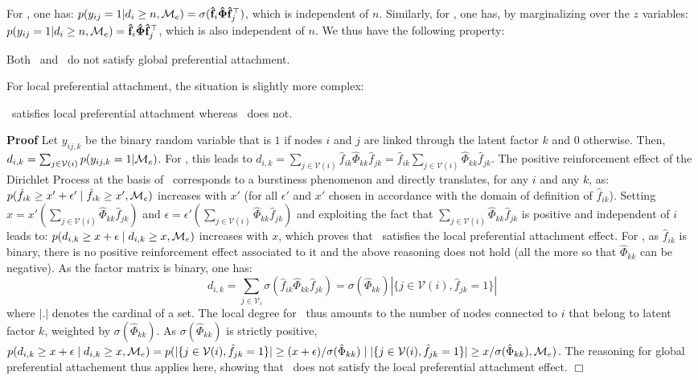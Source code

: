 For \ifm, one has: $p(y_{ij}=1 | d_i \ge n, \mathcal{M}_e) = \sigma(\mathbf{\hat{f}}_i \mathbf{\hat{\Phi}} \mathbf{\hat{f}}_j^\top)$, which is independent of $n$. Similarly, for \imb, one has, by marginalizing over the $z$ variables: $p(y_{ij}=1 | d_i \ge n, \mathcal{M}_e) = \mathbf{\hat{f}}_i \mathbf{\hat{\Phi}} \mathbf{\hat{f}}_j^\top$, which is also independent of $n$. We thus have the following property:
%
\begin{proposition}[]
\label{pref-attch-glob}
Both \ifm\ and \imb\ do not satisfy global preferential attachment.
\end{proposition}

For local preferential attachment, the situation is slightly more complex:
%
\begin{proposition}[]
\label{pref-attch-loc}
\imb\ satisfies local preferential attachment whereas \ifm\ does not.
\end{proposition}
%
\noindent \textbf{Proof} Let $y_{ij,k}$ be the binary random variable that is $1$ if nodes $i$ and $j$ are linked through the latent factor $k$ and $0$ otherwise. Then, $d_{i,k} = \sum_{j \in \mathcal{V}(i)} p(y_{ij,k} =1 | \mathcal{M}_e)$. For \imb, this leads to $d_{i,k} = \sum_{j \in \mathcal{V}(i)} \hat{f}_{ik} \hat{\Phi}_{kk} \hat{f}_{jk} = \hat{f}_{ik} \sum_{j \in \mathcal{V}(i)} \hat{\Phi}_{kk} \hat{f}_{jk}$. The positive reinforcement effect of the Dirichlet Process \cite{teh2006hierarchical} at the basis of \imb\ corresponds to a burstiness phenomenon and directly translates, for any $i$ and any $k$, as: $p(\hat{f}_{ik} \ge x'+\epsilon' \mid \hat{f}_{ik} \ge x',\mathcal{M}_e)$ increases with $x'$ (for all $\epsilon'$ and $x'$ chosen in accordance with the domain of definition of $\hat{f}_{ik}$). Setting $x=x'(\sum_{j \in \mathcal{V}(i)} \hat{\Phi}_{kk} \hat{f}_{jk})$ and $\epsilon = \epsilon'(\sum_{j \in \mathcal{V}(i)} \hat{\Phi}_{kk} \hat{f}_{jk})$ and exploiting the fact that $\sum_{j \in \mathcal{V}(i)} \hat{\Phi}_{kk} \hat{f}_{jk}$ is positive and independent of $i$ leads to: $p(d_{i,k} \ge x+\epsilon \mid d_{i,k} \ge x, \mathcal{M}_e)$ increases with $x$, which proves that \imb\ satisfies the local preferential attachment effect. For \ifm, as $\hat{f}_{ik}$ is binary, there is no positive reinforcement effect associated to it and the above reasoning does not hold (all the more so that $\hat{\Phi}_{kk}$ can be negative). As the factor matrix is binary, one has:
%
\[ 
d_{i,k} = \sum_{j \in \mathcal{V}_i} \sigma(\hat{f}_{ik} \hat{\Phi}_{kk} \hat{f}_{jk}) =  \sigma(\hat{\Phi}_{kk}) |\{j \in \mathcal{V}(i), \hat{f}_{jk} =1\}|
\]
%
where $|.|$ denotes the cardinal of a set. The local degree for \ifm\ thus amounts to the number of nodes connected to $i$ that belong to latent factor $k$, weighted by $\sigma(\hat{\Phi}_{kk})$. As $\sigma(\hat{\Phi}_{kk})$ is strictly positive,  $p(d_{i,k} \ge x+\epsilon \mid d_{i,k} \ge x, \mathcal{M}_e) = p(|\{j \in \mathcal{V}(i), \hat{f}_{jk} =1\}| \ge (x+\epsilon)/ \sigma(\hat{\Phi}_{kk}) \mid |\{j \in \mathcal{V}(i), \hat{f}_{jk} =1\}| \ge x/\sigma(\hat{\Phi}_{kk}), \mathcal{M}_e)$. The reasoning for global preferential attachement thus applies here, showing that \ifm\ does not satisfy the local preferential attachment effect. \hspace{7.1cm} $\Box$


